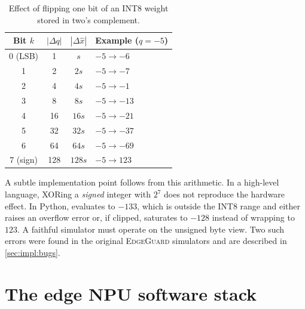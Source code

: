 \begin{table}[t]
\centering
\caption{Effect of flipping one bit of an INT8 weight stored in two's complement.}
\label{tab:bitflip_effect}
\begin{tabular}{cccl}
\toprule
\textbf{Bit $k$} & \textbf{$|\Delta q|$} & \textbf{$|\Delta \hat x|$} & \textbf{Example ($q=-5$)} \\
\midrule
0 (LSB) & 1   & $s$     & $-5 \to -6$ \\
1       & 2   & $2s$    & $-5 \to -7$ \\
2       & 4   & $4s$    & $-5 \to -1$ \\
3       & 8   & $8s$    & $-5 \to -13$ \\
4       & 16  & $16s$   & $-5 \to -21$ \\
5       & 32  & $32s$   & $-5 \to -37$ \\
6       & 64  & $64s$   & $-5 \to -69$ \\
7 (sign)& 128 & $128s$  & $-5 \to 123$ \\
\bottomrule
\end{tabular}
\end{table}

A subtle implementation point follows from this arithmetic. In a high-level language, XORing a
\emph{signed} integer with $2^7$ does not reproduce the hardware effect. In Python,
 evaluates to $-133$, which is outside the INT8 range and either raises an
overflow error or, if clipped, saturates to $-128$ instead of wrapping to $123$. A faithful
simulator must operate on the unsigned byte view. Two such errors were found in the original
\textsc{EdgeGuard} simulators and are described in \cref{sec:impl:bugs}.

\section{The edge NPU software stack}
\label{sec:bg:npu}

